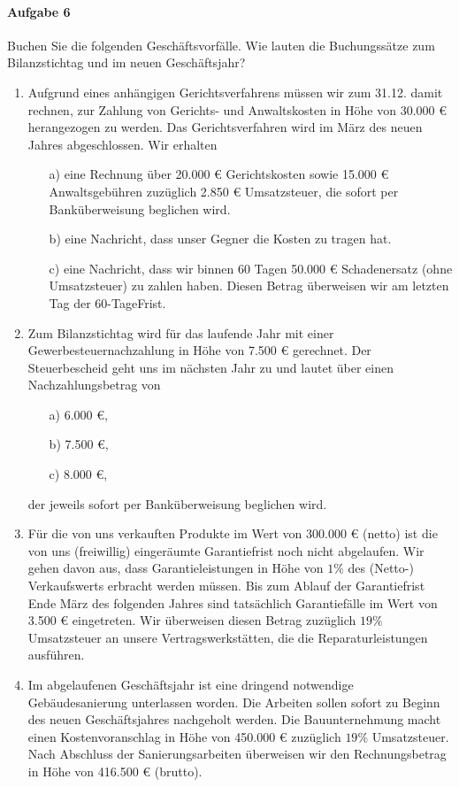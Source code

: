 \documentclass[paper=a4, fontsize=11pt]{scrartcl}
\numberwithin{equation}{section}
\numberwithin{figure}{section}
\numberwithin{table}{section}
\begin{document}
\paragraph{Aufgabe 6}
Buchen Sie die folgenden Geschäftsvorfälle. Wie lauten die Buchungssätze zum Bilanzstichtag und im neuen Geschäftsjahr? \\
\begin{enumerate}
\item Aufgrund eines anhängigen Gerichtsverfahrens müssen wir zum 31.12. damit rechnen, zur Zahlung von Gerichts- und Anwaltskosten in Höhe von 30.000 € herangezogen zu werden.   Das Gerichtsverfahren wird im März des neuen Jahres abgeschlossen. Wir erhalten 
\begin{itemize}
\item[a)] eine Rechnung über 20.000 € Gerichtskosten sowie 15.000 € Anwaltsgebühren zuzüglich 2.850 € Umsatzsteuer, die sofort per Banküberweisung beglichen wird. 
\item[b)] eine Nachricht, dass unser Gegner die Kosten zu tragen hat. 
\item[c)] eine Nachricht, dass wir binnen 60 Tagen 50.000 € Schadenersatz (ohne Umsatzsteuer) zu zahlen haben. Diesen Betrag überweisen wir am letzten Tag der 60-TageFrist. 
\end{itemize}
\item Zum Bilanzstichtag wird für das laufende Jahr mit einer Gewerbesteuernachzahlung in Höhe von 7.500 € gerechnet. Der Steuerbescheid geht uns im nächsten Jahr zu und lautet über einen Nachzahlungsbetrag von
\begin{itemize}
\item[a)] 6.000 €, 
\item[b)] 7.500 €, 
\item[c)] 8.000 €,  
\end{itemize} 
der jeweils sofort per Banküberweisung beglichen wird. 
\item Für die von uns verkauften Produkte im Wert von 300.000 € (netto) ist die von uns (freiwillig) eingeräumte Garantiefrist noch nicht abgelaufen. Wir gehen davon aus, dass Garantieleistungen in Höhe von $1 \%$ des (Netto-) Verkaufswerts erbracht werden müssen. Bis zum Ablauf der Garantiefrist Ende März des folgenden Jahres sind tatsächlich Garantiefälle im Wert von 3.500 € eingetreten. Wir überweisen diesen Betrag zuzüglich $19 \%$ Umsatzsteuer an unsere Vertragswerkstätten, die die Reparaturleistungen ausführen. 
\item Im abgelaufenen Geschäftsjahr ist eine dringend notwendige Gebäudesanierung unterlassen worden. Die Arbeiten sollen sofort zu Beginn des neuen Geschäftsjahres nachgeholt werden. Die Bauunternehmung macht einen Kostenvoranschlag in Höhe von 450.000 € zuzüglich $19 \%$ Umsatzsteuer. Nach Abschluss der Sanierungsarbeiten überweisen wir den Rechnungsbetrag in Höhe von 416.500 € (brutto). 
\end{enumerate}
\end{document}
